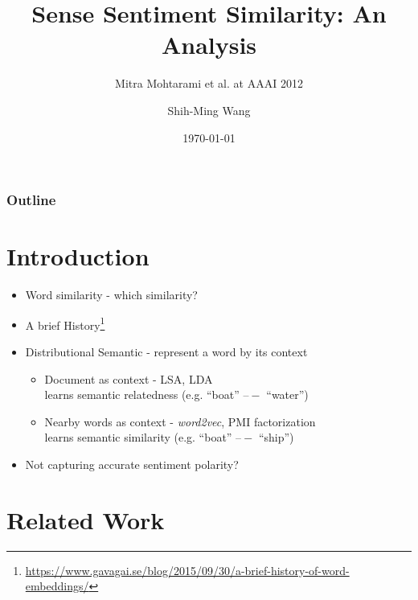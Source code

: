 \documentclass[compress]{beamer}
\title{Sense Sentiment Similarity: An Analysis}
\subtitle{Mitra Mohtarami et al. at AAAI 2012}
\author{Shih-Ming Wang}
\institute{NLPLab, Institute of Information Science, Academia Sinica}
\date{\today}
\begin{document}
\beamertemplatenavigationsymbolsempty

\begin{frame}
 \maketitle
\end{frame}

\begin{frame}
	 \frametitle{Outline}
	 \tableofcontents
\end{frame}

\section{Introduction}
\begin{frame}{\secname}
\begin{itemize}
\item Word similarity - which similarity?
\item A brief History\footnote{\url{https://www.gavagai.se/blog/2015/09/30/a-brief-history-of-word-embeddings/}}
\item Distributional Semantic - represent a word by its context
\begin{itemize}
      \item Document as context - LSA, LDA\\
      learns semantic relatedness (e.g. ``boat'' $–-$ ``water'')
      \item Nearby words as context - \textit{word2vec}, PMI factorization\\
      learns semantic similarity (e.g. ``boat'' $–-$ ``ship'')
\end{itemize}
\item Not capturing accurate sentiment polarity?
\end{itemize}
\end{frame}

\section{Related Work}
\end{document}
